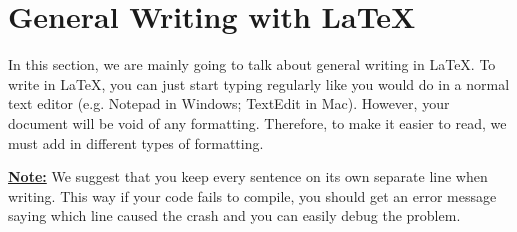 \documentclass[]{article}%
\theoremstyle{definition}
\begin{document}
	
	\section{General Writing with \LaTeX}
	In this section, we are mainly going to talk about general writing in \LaTeX.
	To write in \LaTeX, you can just start typing regularly like you would do in a normal text editor (e.g. Notepad in Windows; TextEdit in Mac).
	However, your document will be void of any formatting.
	Therefore, to make it easier to read, we must add in different types of formatting. \vspace{0.25cm}
	
	\noindent \textbf{\underline{Note:}} We suggest that you keep every sentence on its own separate line when writing.
	This way if your code fails to compile, you should get an error message saying which line caused the crash and you can easily debug the problem.
	
\end{document}
